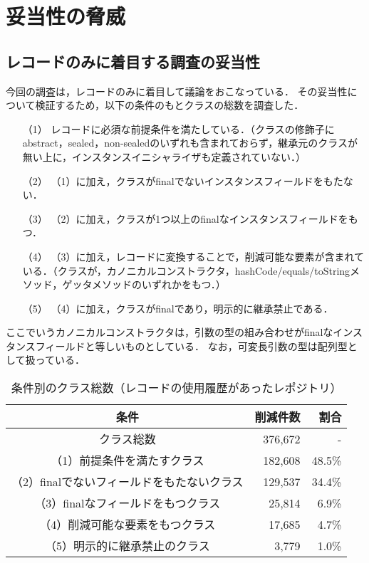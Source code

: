 \section{妥当性の脅威\label{threats}}

\subsection{レコードのみに着目する調査の妥当性}

今回の調査は，レコードのみに着目して議論をおこなっている．
その妥当性について検証するため，以下の条件のもとクラスの総数を調査した．

\begin{itemize}
  \item[（1） ] レコードに必須な前提条件を満たしている．（クラスの修飾子にabstract，sealed，non-sealedのいずれも含まれておらず，継承元のクラスが無い上に，インスタンスイニシャライザも定義されていない．）
  \item[（2） ] （1）に加え，クラスがfinalでないインスタンスフィールドをもたない．
  \item[（3） ] （2）に加え，クラスが1つ以上のfinalなインスタンスフィールドをもつ．
  \item[（4） ] （3）に加え，レコードに変換することで，削減可能な要素が含まれている．（クラスが，カノニカルコンストラクタ，hashCode/equals/toStringメソッド，ゲッタメソッドのいずれかをもつ．）
  \item[（5） ] （4）に加え，クラスがfinalであり，明示的に継承禁止である．
\end{itemize}

ここでいうカノニカルコンストラクタは，引数の型の組み合わせがfinalなインスタンスフィールドと等しいものとしている．
なお，可変長引数の型は配列型として扱っている．

\begin{table}[t]
  \caption{条件別のクラス総数（レコードの使用履歴があったレポジトリ）}
  \label{class_immutability_71}
  \centering
  \begin{tabular}{c||r|r}
      \hline
      条件 & 削減件数 & 割合\\
      \hline\hline
      クラス総数 & 376,672 & -\\
      （1）前提条件を満たすクラス & 182,608 & 48.5\%\\
      （2）finalでないフィールドをもたないクラス & 129,537 & 34.4\%\\
      （3）finalなフィールドをもつクラス & 25,814 & 6.9\%\\
      （4）削減可能な要素をもつクラス & 17,685 & 4.7\%\\
      （5）明示的に継承禁止のクラス & 3,779 & 1.0\%\\
      \hline
  \end{tabular}
\end{table}

